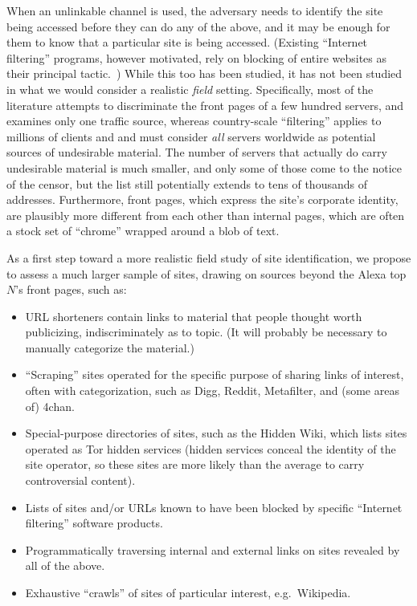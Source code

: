\documentclass[oneside]{zarticle}
\begin{document}
When an unlinkable channel is used, the adversary needs to identify
the site being accessed before they can do any of the above, and it
may be enough for them to know that a particular site is being
accessed.  (Existing “Internet filtering” programs, however motivated,
rely on blocking of entire websites as their principal
tactic.~\cite{aase2012whiskey}) While this too has been studied, it
has not been studied in what we would consider a realistic
\emph{field} setting.  Specifically, most of the literature attempts
to discriminate the front pages of a few hundred servers, and examines
only one traffic source, whereas country-scale “filtering” applies to
millions of clients and and must consider \emph{all} servers worldwide as
potential sources of undesirable material.  The number of servers that
actually do carry undesirable material is much smaller, and only some
of those come to the notice of the censor, but the list still
potentially extends to tens of thousands of addresses.  Furthermore,
front pages, which express the site's corporate identity, are
plausibly more different from each other than internal pages, which
are often a stock set of “chrome” wrapped around a blob of text.

As a first step toward a more realistic field study of site
identification, we propose to assess a much larger sample of sites,
drawing on sources beyond the Alexa top $N$'s front pages, such as:

\begin{itemize}
\item URL shorteners contain links to material that people thought
  worth publicizing, indiscriminately as to topic.  (It will probably
  be necessary to manually categorize the material.)
\item “Scraping” sites operated for the specific purpose of sharing
  links of interest, often with categorization, such as Digg, Reddit,
  Metafilter, and (some areas of) 4chan.
\item Special-purpose directories of sites, such as the Hidden Wiki,
  which lists sites operated as Tor hidden services (hidden services
  conceal the identity of the site operator, so these sites are more
  likely than the average to carry controversial content).
\item Lists of sites and/or URLs known to have been blocked by
  specific “Internet filtering” software products.
\item Programmatically traversing internal and external links on sites
  revealed by all of the above.
\item Exhaustive “crawls” of sites of particular interest, e.g.\ Wikipedia.
\end{itemize}
\end{document}
